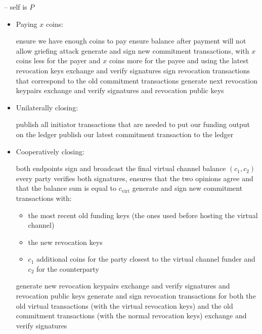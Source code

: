 \begin{center}
\begin{processbox}{\pchan -- self is $P$}
\begin{itemize}
      \item Paying $x$ coins:
      \begin{algorithmic}[0]
        \State ensure we have enough coins to pay
          \State ensure balance after payment will not allow griefing attack
        \EndIf
        \State generate and sign new commitment transactions, with $x$ coins
        less for the payer and $x$ coins more for the payee and using the latest
        revocation keys
        \State exchange and verify signatures
        \State sign revocation transactions that correspond to the old
        commitment transactions
        \State generate next revocation keypairs
        \State exchange and verify signatures and revocation public keys
      \end{algorithmic}

      \item Unilaterally closing:
      \begin{algorithmic}[0]
        \State publish all initiator transactions that are needed to put our
        funding output on the ledger
        \State publish our latest commitment transaction to the ledger
      \end{algorithmic}

      \item Cooperatively closing:
      \begin{algorithmic}[0]
        \State {}
        \State both endpoints sign and broadcast the final virtual channel
        balance $(c_1, c_2)$
        \State every party verifies both signatures, ensures that the two
        opinions agree and that the balance sum is equal to $c_{\mathrm{virt}}$
        \State generate and sign new commitment transactions with:
        \begin{itemize}
          \item the most recent old funding keys (the ones used before hosting
          the virtual channel)
          \item the new revocation keys
          \item $c_1$ additional coins for the party closest to the virtual
          channel funder and $c_2$ for the counterparty
        \end{itemize}
        \State generate new revocation keypairs
        \State exchange and verify signatures and revocation public keys
        \State generate and sign revocation transactions for both the old
        virtual transactions (with the virtual revocation keys) and the old
        commitment transactions (with the normal revocation keys)
        \State exchange and verify signatures 
      \end{algorithmic}


\end{itemize}
\end{processbox}
\end{center}
